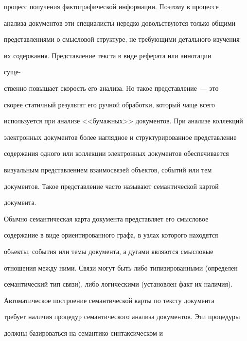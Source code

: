 процесс получения фактографической информации. Поэтому в процессе 

анализа документов эти специалисты нередко довольствуются только общими 

представлениями о смысловой структуре, не требующими детального изучения 

их содержания. Представление текста в виде реферата или аннотации 

суще-\linebreak\vspace*{-12pt}



\pagebreak



\noindent

ственно повышает скорость его анализа. Но такое представление~--- это 

скорее статичный результат его ручной обработки, который чаще всего 

используется при анализе <<бумажных>> документов. При анализе коллекций 

электронных документов более наглядное и структурированное представление 

содержания одного или коллекции электронных документов обеспечивается 

визуальным представлением взаимосвязей объектов, событий или тем 

документов. Такое представление часто называют семантической картой 

документа.

     

     Обычно семантическая карта документа представляет его смысловое 

содержание в виде ориентированного графа, в узлах которого находятся 

объекты, события или темы документа, а дугами являются смысловые 

отношения между ними. Связи могут быть либо типизированными (определен 

семантический тип связи), либо логическими (установлен факт их наличия). 

     

     Автоматическое построение семантической карты по тексту документа 

требует наличия процедур семантического анализа документов. Эти процедуры 

должны базироваться на се\-ман\-ти\-ко-син\-так\-си\-че\-ском и 

